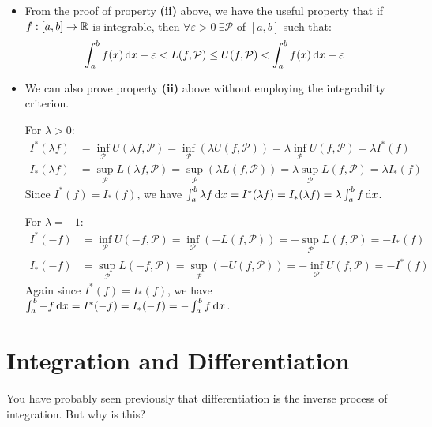 \documentclass[../main.tex]{subfiles}
\begin{document}
\begin{remark}[Remarks]
  \begin{itemize}
    \item From the proof of property \textbf{(ii)} above, we have the useful property that if $f: [a, b] \to \mathbb{R}$ is integrable, then $\forall \varepsilon > 0\ \exists \mathcal{P}$ of $[a, b]$ such that:
      \[
        \int_{a}^{b} f(x) \d{x} -\varepsilon < L(f, \mathcal{P}) \leq U(f, \mathcal{P}) < \int_{a}^{b} f(x) \d{x} + \varepsilon
      \]
    \item We can also prove property \textbf{(ii)} above without employing the integrability criterion.

      For $\lambda > 0$:
      \begin{align*}
        I^{*}(\lambda f) &= \inf_{\mathcal{P}} U(\lambda f, \mathcal{P}) = \inf_{\mathcal{P}} (\lambda U(f, \mathcal{P})) = \lambda \inf_{\mathcal{P}} U(f, \mathcal{P}) = \lambda I^{*}(f) \\
        I_{*}(\lambda f) &= \sup_{\mathcal{P}} L(\lambda f, \mathcal{P}) = \sup_{\mathcal{P}} (\lambda L(f, \mathcal{P})) = \lambda \sup_{\mathcal{P}} L(f, \mathcal{P}) = \lambda I_{*}(f)
      \end{align*}
      Since $I^{*}(f) = I_{*}(f)$, we have $\int_{a}^{b} \lambda f \d{x} = I^{*}(\lambda f) = I_{*}(\lambda f) = \lambda \int_{a}^{b} f \d{x}$.

      For $\lambda = -1$:
      \begin{align*}
        I^{*}(-f) &= \inf_{\mathcal{P}} U(-f, \mathcal{P}) = \inf_{\mathcal{P}} (-L(f, \mathcal{P})) = - \sup_{\mathcal{P}} L(f, \mathcal{P}) = -I_{*}(f) \\
        I_{*}(-f) &= \sup_{\mathcal{P}} L(-f, \mathcal{P}) = \sup_{\mathcal{P}} (-U(f, \mathcal{P})) = - \inf_{\mathcal{P}} U(f, \mathcal{P}) = -I^{*}(f)
      \end{align*}
      Again since $I^{*}(f) = I_{*}(f)$, we have $\int_{a}^{b} -f \d{x} = I^{*}(-f) = I_{*}(-f) = - \int_{a}^{b} f \d{x}$.
  \end{itemize}
\end{remark}
\section{Integration and Differentiation}
You have probably seen previously that differentiation is the inverse process of integration.
But why is this?
\end{document}
